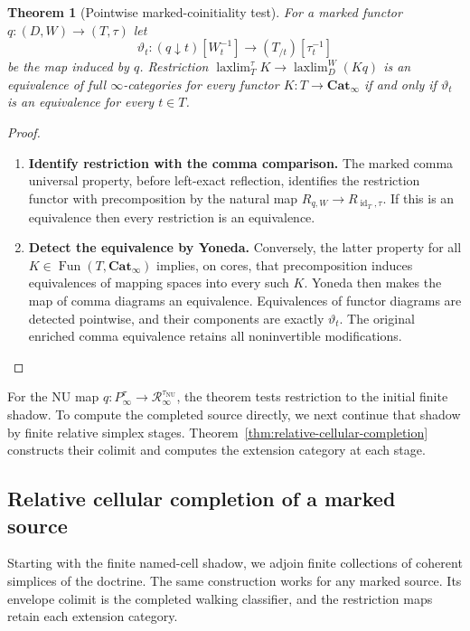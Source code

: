 \documentclass[oneside]{article}
\theoremstyle{plain}
\newtheorem{theorem}{Theorem}[section]
\theoremstyle{definition}
\theoremstyle{remark}
\newcommand{\Cat}{\mathbf{Cat}_{\infty}}
\newcommand{\Fun}{\operatorname{Fun}}
\newcommand{\NU}{\mathrm{NU}}
\newcommand{\RNU}{\mathcal R_{\infty}}
\newcommand{\id}{\operatorname{id}}
\newcommand{\laxlim}{\mathop{\mathrm{laxlim}}}
\begin{document}
\begin{theorem}[Pointwise marked-coinitiality test]
\label{thm:pointwise-marked-coinitial}
For a marked functor $q:(D,W)\to(T,\tau)$ let
\[
 \vartheta_t:(q\downarrow t)[W_t^{-1}]
 \longrightarrow (T_{/t})[\tau_t^{-1}]
\]
be the map induced by $q$. Restriction
$\laxlim_T^\tau K\to\laxlim_D^W(Kq)$ is an equivalence of full
$\infty$-categories for every functor $K:T\to\Cat$ if and only if
$\vartheta_t$ is an equivalence for every $t\in T$.
\end{theorem}
\begin{proof}
\leavevmode
\begin{enumerate}
\item \textbf{Identify restriction with the comma comparison.}
The marked comma universal property, before left-exact reflection,
identifies the restriction functor with precomposition by the natural
map $R_{q,W}\to R_{\id_T,\tau}$. If this is an equivalence then every
restriction is an equivalence. 
\item \textbf{Detect the equivalence by Yoneda.}
Conversely, the latter property for all
$K\in\Fun(T,\Cat)$ implies, on cores, that precomposition induces
equivalences of mapping spaces into every such $K$. Yoneda then makes
the map of comma diagrams an equivalence. Equivalences of functor
diagrams are detected pointwise, and their components are exactly
$\vartheta_t$. The original enriched comma equivalence retains all
noninvertible modifications.
\qedhere
\end{enumerate}
\end{proof}

For the NU map $q:P_\infty^\tau\to\RNU^{\tau_{\NU}}$, the theorem
tests restriction to the initial finite shadow. To compute the
completed source directly, we next continue that shadow by finite
relative simplex stages. Theorem~\ref{thm:relative-cellular-completion}
constructs their colimit and computes the extension category at
each stage.


\subsection{Relative cellular completion of a marked source}
\label{subsec:relative-cellular-completion}

Starting with the finite named-cell shadow, we adjoin finite collections
of coherent simplices of the doctrine. The same construction works for
any marked source. Its envelope colimit is the completed walking
classifier, and the restriction maps retain each extension category.
\end{document}
